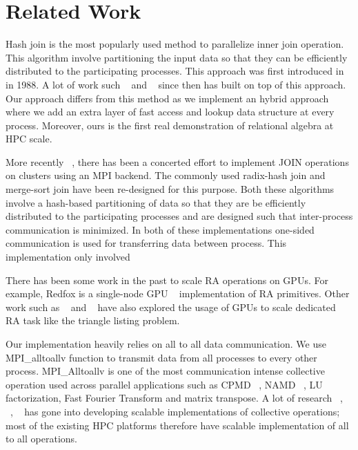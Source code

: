 
\section{Related Work}
\label{sec:related}
%

Hash join is the most popularly used method to parallelize inner join
operation. This algorithm involve partitioning the input data so that they can be efficiently distributed
to the participating processes. This approach was first introduced in ~\cite{Valduriez:1988:PET:54616.54618} in 1988.
A lot of work such ~\cite{Cheiney:1990:PST:94362.94445} and ~\cite{Cacace:1991:OPS:111828.111831} since then has built on top of this approach. 
Our approach differs from this method as we implement an hybrid approach 
where we add an extra layer of fast access and lookup data structure at every process. 
Moreover, ours is the first real demonstration of relational algebra at HPC scale.

More recently ~\cite{Barthels:2017:DJA:3055540.3055545}, there has been a concerted effort to implement JOIN operations on
clusters using an MPI backend. The commonly used radix-hash join and merge-sort join have been re-designed
for this purpose. Both these algorithms involve a hash-based partitioning of data so that they are be efficiently
distributed to the participating processes and are designed such that inter-process communication is minimized.
In both of these implementations one-sided communication is used for transferring data between process. This implementation
only involved 

There has been some work in the past to scale RA operations on GPUs. For example,
Redfox is a single-node GPU ~\cite{Wu:2014:RFE:2581122.2544166} implementation of RA primitives. Other work such as ~\cite{Martinez-Angeles:2016:RLG:2932241.2932244} and ~\cite{Zinn:2016:GJA:2884045.2884054} have also explored the usage of GPUs to scale dedicated RA task like the triangle listing problem.

Our implementation heavily relies on all to all data communication. We use MPI\_alltoallv function to transmit data from all processes to every other process.
MPI\_Alltoallv is one of the most communication intense collective operation used across parallel applications such as 
CPMD ~\cite{cpmd-web}, NAMD ~\cite{1592872}, LU factorization, Fast Fourier Transform and matrix transpose.
A lot of research ~\cite{4536141}, ~\cite{642949}, ~\cite{Thakur:2005:OCC:2747766.2747771} has gone into developing scalable implementations of collective operations; most of the existing HPC platforms therefore have scalable implementation of all to all operations. 



